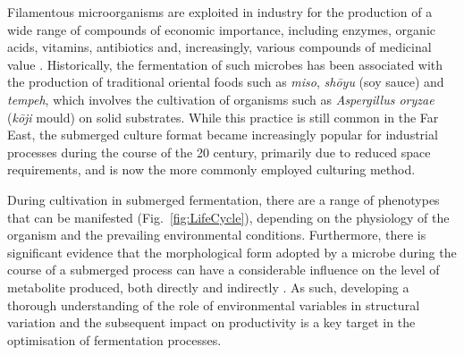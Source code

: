 Filamentous microorganisms are exploited in industry for the production of a wide range of compounds of economic importance, including enzymes, organic acids, vitamins, antibiotics and, increasingly, various compounds of medicinal value \cite{archer2001,carlile2001,papagiannireview}. Historically, the fermentation of such microbes has been associated with the production of traditional oriental foods such as \emph{miso}, \emph{sh\={o}yu} (soy sauce) and \emph{tempeh}, which involves the cultivation of organisms such as \emph{Aspergillus oryzae} (\emph{k\={o}ji} mould) on solid substrates. While this practice is still common in the Far East, the submerged culture format became increasingly popular for industrial processes during the course of the 20 century, primarily due to reduced space requirements, and is now the more commonly employed culturing method.

During cultivation in submerged fermentation, there are a range of phenotypes that can be manifested (Fig.~\ref{fig:LifeCycle}), depending on the physiology of the organism and the prevailing environmental conditions. Furthermore, there is significant evidence that the morphological form adopted by a microbe during the course of a submerged process can have a considerable influence on the level of metabolite produced, both directly and indirectly \cite{papagiannireview}. As such, developing a thorough understanding of the role of environmental variables in structural variation and the subsequent impact on productivity is a key target in the optimisation of fermentation processes.

